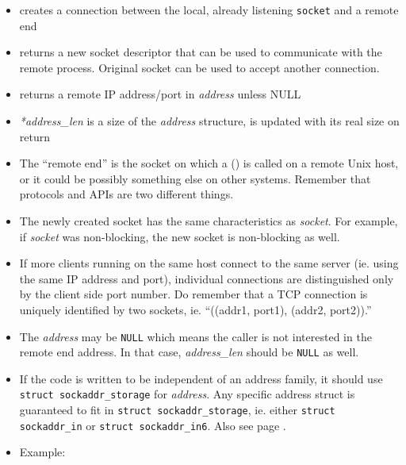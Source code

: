 
\begin{slide}
\begin{itemize}
\item creates a connection between the local, already listening \texttt{socket}
and a remote end
\item returns a new socket descriptor that can be used to communicate with the
remote process.  Original socket can be used to accept another connection.
\item returns a remote IP address/port in \emph{address} unless NULL
\item \emph{*address\_len} is a size of the \emph{address} structure, is updated
with its real size on return
\end{itemize}
\end{slide}

\label{ACCEPT}

\begin{itemize}
\item The ``remote end'' is the socket on which a () is
called on a remote Unix host, or it could be possibly something else on other
systems.  Remember that protocols and APIs are two different things.
\item The newly created socket has the same characteristics as \emph{socket}.
For example, if \emph{socket} was non-blocking, the new socket is non-blocking
as well.
\item If more clients running on the same host connect to the same server (ie.
using the same IP address and port), individual connections are distinguished
only by the client side port number.  Do remember that a TCP connection is
uniquely identified by two sockets, ie. ``((addr1, port1), (addr2, port2)).''
\item The \emph{address} may be \texttt{NULL} which means the caller is not
interested in the remote end address.  In that case, \emph{address\_len} should
be \texttt{NULL} as well.
\item If the code is written to be independent of an address family, it should
use \texttt{struct sockaddr\_storage} for \emph{address}.  Any specific address
struct is guaranteed to fit in \texttt{struct sockaddr\_storage}, ie. either
\texttt{struct sockaddr\_in} or \texttt{struct sockaddr\_in6}.  Also see page
\pageref{TCPCLNTEXAMPLE}.
\item \label{TCP_SINK_SERVER_C} Example: 
\end{itemize}


